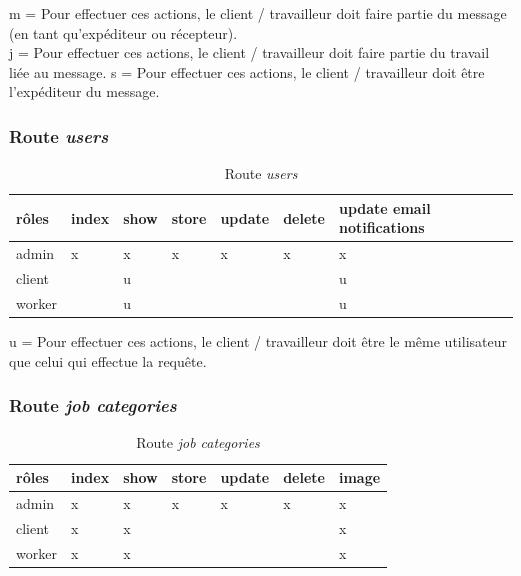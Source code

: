 \documentclass[
    iai, %
    il, %
]{heig-tb}
\begin{document}
m = Pour effectuer ces actions, le client / travailleur doit faire partie du message (en tant qu'expéditeur ou récepteur). \\
j = Pour effectuer ces actions, le client / travailleur doit faire partie du travail liée au message.
s = Pour effectuer ces actions, le client / travailleur doit être l'expéditeur du message.

\subsubsection{Route \emph{users}}

\begin{table}[h]
    \begin{center}
        \caption{Route \emph{users} \label{autorisations-route-users}}
        \begin{tabularx}{1.0\textwidth} {l|l|l|l|l|l|X}
            rôles  & index & show & store & update & delete & update email notifications \\ \hline
            admin  & x     & x    & x     & x      & x      & x                          \\
            client &       & u    &       &        &        & u                          \\
            worker &       & u    &       &        &        & u                          \\
        \end{tabularx}
    \end{center}
\end{table}

u = Pour effectuer ces actions, le client / travailleur doit être le même utilisateur que celui qui effectue la requête.

\subsubsection{Route \emph{job categories}}

\begin{table}[h]
    \begin{center}
        \caption{Route \emph{job categories} \label{autorisations-route-job-categories}}
        \begin{tabularx}{1.0\textwidth} {X|X|X|X|X|X|X}
            rôles  & index & show & store & update & delete & image \\ \hline
            admin  & x     & x    & x     & x      & x      & x     \\
            client & x     & x    &       &        &        & x     \\
            worker & x     & x    &       &        &        & x     \\
        \end{tabularx}
    \end{center}
\end{table}
\end{document}
